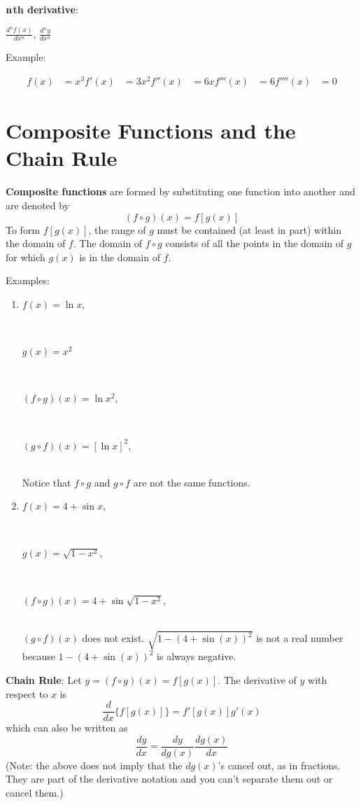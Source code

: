 \documentclass[]{book}
\theoremstyle{definition}
\theoremstyle{definition}
\theoremstyle{definition}
\theoremstyle{remark}
\begin{document}
\parbox[t]{2in}{{\bf $\bf n$th derivative}:} \(\frac{d^nf(x)}{dx^n}\),
\(\frac{d^ny}{dx^n}\)

Example:

\begin{align*}
f(x) &=x^3
f'(x) &=3x^2
f''(x) &=6x 
f'''(x) &=6
f''''(x) &=0
\end{align*}

\section{Composite Functions and the Chain
Rule}\label{composite-functions-and-the-chain-rule}

\textbf{Composite functions} are formed by substituting one function
into another and are denoted by \[(f\circ g)(x)=f[g(x)]\] To form
\(f[g(x)]\), the range of \(g\) must be contained (at least in part)
within the domain of \(f\). The domain of \(f\circ g\) consists of all
the points in the domain of \(g\) for which \(g(x)\) is in the domain of
\(f\).

Examples:

\begin{enumerate}
        \item \parbox[t]{2in}{$f(x)=\ln x$,}  \phantom{$0<x<\infty$}\\ 
            \parbox[t]{2in}{$g(x)=x^2$} \phantom{$-\infty<x<\infty$}\\ 
            \parbox[t]{2in}{$(f\circ g)(x)=\ln x^2$,} \\ 
            \parbox[t]{2in}{$(g\circ f)(x)=[\ln x]^2$,} \phantom{$0<x<\infty$}\\ 
                Notice that $f\circ g$ and $g\circ f$ are not the same functions.       
        \item \parbox[t]{2in}{$f(x)=4+\sin x$,} \phantom{$-\infty<x<\infty$}\\
            \parbox[t]{2in}{$g(x)=\sqrt{1-x^2}$,} \phantom{$-1\le x\le 1$}\\
            \parbox[t]{2in}{$(f\circ g)(x)=4+\sin \sqrt{1-x^2}$,} \phantom{$-1\le x\le 1$}\\ 
                $(g\circ f)(x)$ does not exist. $\sqrt{1-(4+\sin(x))^2}$ is not a real number because $1-(4+\sin(x))^2$ is always negative.
\end{enumerate}

\textbf{Chain Rule}: Let \(y=(f\circ g)(x)= f[g(x)]\). The derivative of
\(y\) with respect to \(x\) is
\[\frac{d}{dx} \{ f[g(x)] \} = f'[g(x)] g'(x)\] which can also be
written as \[\frac{dy}{dx}=\frac{dy}{dg(x)} \frac{dg(x)}{dx}\] (Note:
the above does not imply that the \(dg(x)\)'s cancel out, as in
fractions. They are part of the derivative notation and you can't
separate them out or cancel them.)
\end{document}
